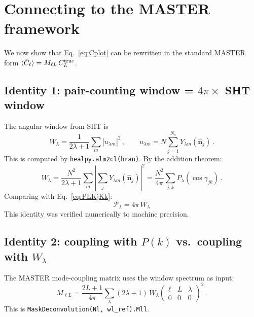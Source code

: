 \documentclass[11pt,a4paper]{article}
\newcommand{\hchi}{\hat{\bm{n}}}
\newcommand{\Cl}{\hat{C}_\ell}
\begin{document}
\section{Connecting to the MASTER framework}
\label{sec:master}

We now show that Eq.~\eqref{eq:Cplot} can be rewritten in the standard
MASTER form $\langle\Cl\rangle = M_{\ell L}\,C_L^{\rm true}$.

\subsection{Identity 1: pair-counting window = $4\pi \times$ SHT window}

The angular window from SHT is
\begin{equation}
  W_\lambda = \frac{1}{2\lambda+1}
  \sum_m |u_{\lambda m}|^2\,,
  \qquad
  u_{\lambda m} = N\sum_{j=1}^{N_s} Y_{\lambda m}(\hchi_j)\,.
\end{equation}
This is computed by {\tt healpy.alm2cl(hran)}.
By the addition theorem:
\begin{equation}
  W_\lambda
  = \frac{N^2}{2\lambda+1}\sum_m
  \left|\sum_j Y_{\lambda m}(\hchi_j)\right|^2
  = \frac{N^2}{4\pi}
  \sum_{j,k} P_\lambda(\cos\gamma_{jk})\,.
\end{equation}
Comparing with Eq.~\eqref{eq:PLKjKk}:
\begin{equation}
  \boxed{
    \mathcal{P}_\lambda = 4\pi\, W_\lambda
  }
  \label{eq:identity1}
\end{equation}
This identity was verified numerically to machine precision.

\subsection{Identity 2: coupling with $P(k)$ vs.\ coupling with $W_\lambda$}

The MASTER mode-coupling matrix uses the window spectrum as input:
\begin{equation}
  M_{\ell L} = \frac{2L+1}{4\pi}
  \sum_\lambda (2\lambda+1)\, W_\lambda
  \begin{pmatrix} \ell & L & \lambda \\ 0 & 0 & 0 \end{pmatrix}^{\!2}\,.
  \label{eq:Mll}
\end{equation}
This is \texttt{MaskDeconvolution(Nl, wl\_ref).Mll}.
\end{document}
